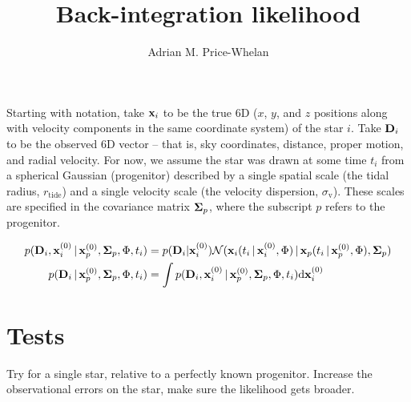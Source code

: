 \documentclass[letterpaper,12pt,preprint]{aastex}
\newcommand{\given}{\,|\,}
\newcommand{\dd}{\mathrm{d}}
\begin{document}
\title{Back-integration likelihood}
\author{Adrian M. Price-Whelan}

Starting with notation, take ${\bf x}_i$ to be the true 6D ($x$, $y$, and $z$ positions along with velocity components in the same coordinate system) of the star $i$. Take ${\bf D}_i$ to be the observed 6D vector -- that is, sky coordinates, distance, proper motion, and radial velocity. For now, we assume the star was drawn at some time $t_i$ from a spherical Gaussian (progenitor) described by a single spatial scale (the tidal radius, $r_{\mathrm{tide}}$) and a single velocity scale (the velocity dispersion, $\sigma_\mathrm{v}$). These scales are specified in the covariance matrix ${\bf \Sigma}_p$, where the subscript $p$ refers to the progenitor.

\begin{align}
	p({\bf D}_i, {\bf x}_i^{(0)} \given {\bf x}_p^{(0)}, {\bf \Sigma}_p, \Phi, t_i) &= 
	p({\bf D}_i | {\bf x}_i^{(0)}) \mathcal{N}({\bf x}_i(t_i\given {\bf x}_i^{(0)}, \Phi ) \given {\bf x}_p(t_i\given {\bf x}_p^{(0)}, \Phi ), {\bf \Sigma}_p)\\
	p({\bf D}_i \given {\bf x}_p^{(0)}, {\bf \Sigma}_p, \Phi, t_i) &= \int p({\bf D}_i, {\bf x}_i^{(0)} \given {\bf x}_p^{(0)}, {\bf \Sigma}_p, \Phi, t_i) \dd {\bf x}_i^{(0)}
\end{align}

\section{Tests}
Try for a single star, relative to a perfectly known progenitor. Increase the observational errors on the star, make sure the likelihood gets broader.  
\end{document}
